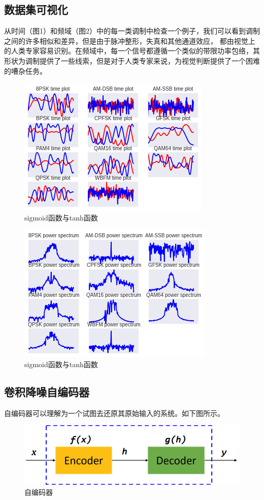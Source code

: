 \subsection{数据集可视化}
从时间（图1）和频域（图2）中的每一类调制中检查一个例子，我们可以看到调制之间的许多相似和差异，但是由于脉冲整形，失真和其他通道效应， 都由视觉上的人类专家容易识别。在频域中，每一个信号都遵循一个类似的带限功率包络，其形状为调制提供了一些线索，但是对于人类专家来说，为视觉判断提供了一个困难的嘈杂任务。\par
\begin{figure}[!h]
	\centering
	\includegraphics[scale=0.9]{figures/chapter_3/signal_view_1}
	\caption{sigmoid函数与tanh函数}\label{fig_2_2}
\end{figure}
\begin{figure}[!h]
	\centering
	\includegraphics[scale=0.9]{figures/chapter_3/signal_view_2}
	\caption{sigmoid函数与tanh函数}\label{fig_2_2}
\end{figure}

\subsection{卷积降噪自编码器}
自编码器可以理解为一个试图去还原其原始输入的系统。如下图所示。
\begin{figure}[!h]
	\centering
	\includegraphics[scale=0.8]{figures/chapter_3/AE}
	\caption{自编码器}	\label{fig_3_2}
\end{figure}

